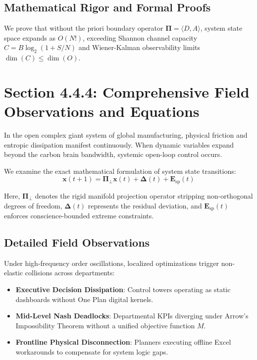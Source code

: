 \documentclass[12pt,a4paper,oneside]{book}
\begin{document}
\subsection*{Mathematical Rigor and Formal Proofs}
We prove that without the priori boundary operator $\mathbf{\Pi} = \langle D, A \rangle$, system state space expands as $O(N!)$, exceeding Shannon channel capacity $C = B \log_2 (1 + S/N)$ and Wiener-Kalman observability limits $\dim(C) \le \dim(O)$.
\clearpage
\section{Section 4.4.4: Comprehensive Field Observations and Equations}

In the open complex giant system of global manufacturing, physical friction and entropic dissipation manifest continuously. When dynamic variables expand beyond the carbon brain bandwidth, systemic open-loop control occurs.

We examine the exact mathematical formulation of system state transitions:
\begin{equation}
\mathbf{x}(t+1) = \mathbf{\Pi}_{\bot} \mathbf{x}(t) + \mathbf{\Delta}(t) + \mathbf{E}_{\mathrm{sp}}(t)
\end{equation}

Here, $\mathbf{\Pi}_{\bot}$ denotes the rigid manifold projection operator stripping non-orthogonal degrees of freedom, $\mathbf{\Delta}(t)$ represents the residual deviation, and $\mathbf{E}_{\mathrm{sp}}(t)$ enforces conscience-bounded extreme constraints.

\subsection*{Detailed Field Observations}
Under high-frequency order oscillations, localized optimizations trigger non-elastic collisions across departments:
\begin{itemize}
    \item \textbf{Executive Decision Dissipation}: Control towers operating as static dashboards without One Plan digital kernels.
    \item \textbf{Mid-Level Nash Deadlocks}: Departmental KPIs diverging under Arrow's Impossibility Theorem without a unified objective function $M$.
    \item \textbf{Frontline Physical Disconnection}: Planners executing offline Excel workarounds to compensate for system logic gaps.
\end{itemize}
\end{document}
